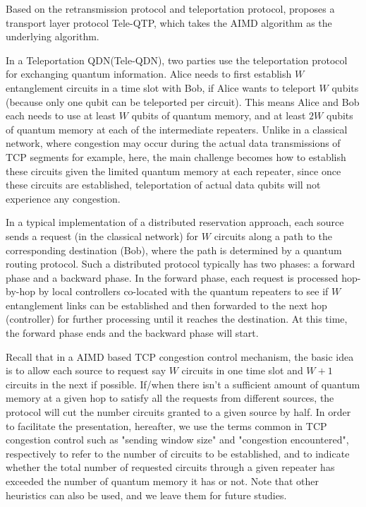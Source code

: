 \documentclass[10pt]{article}
\begin{document}
Based on the retransmission protocol and teleportation protocol, \cite{zhao2021quantum} proposes a transport layer protocol Tele-QTP, which takes the AIMD algorithm as the underlying algorithm. 

In a Teleportation QDN(Tele-QDN), two parties use the teleportation protocol for exchanging quantum information. Alice needs to first establish $W$ entanglement circuits in a time slot with Bob, if Alice wants to teleport $W$ qubits (because only one qubit can be teleported per circuit). This means Alice and Bob each needs to use at least $W$ qubits of quantum memory, and at least $2W$ qubits of quantum memory at each of the intermediate repeaters.
Unlike in a classical network, where congestion may occur during the actual data transmissions of TCP segments for example, here, the main challenge becomes how to establish these circuits given the limited quantum memory at each repeater, since once these circuits are established, teleportation of actual data qubits will not experience any congestion.

In a typical implementation of a distributed reservation approach, each source sends a request (in the classical network) for $W$ circuits along a path to the corresponding destination (Bob), where the path is determined by a quantum routing protocol. Such a distributed protocol typically has two phases: a forward phase and a backward phase. In the forward phase, each request is processed hop-by-hop by local controllers co-located with the quantum repeaters to see if $W$ entanglement links can be established and then forwarded to the next hop (controller) for further processing until it reaches the destination. At this time, the forward phase ends and the backward phase will start.

Recall that in a AIMD based TCP congestion control mechanism, the basic idea is to allow each source to request say $W$ circuits in one
time slot and $W+1$ circuits in the next if possible. If/when there isn't a sufficient amount of quantum memory at a given hop to satisfy all the requests from different sources, the protocol will cut the number circuits granted to a given source by half. In order to facilitate the presentation, hereafter, we use the terms common in TCP congestion control such as "sending window size" and "congestion encountered", respectively to refer to the number of circuits to be established, and to indicate whether the total number of requested circuits through a given repeater has exceeded the number of quantum memory it has or not. Note that other heuristics can also be used, and we leave them for future studies.
\end{document}
